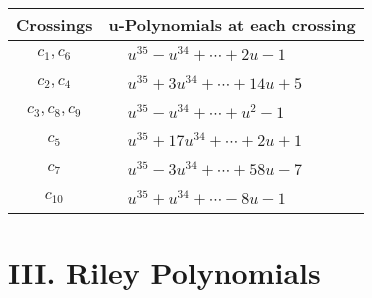 \documentclass[1p]{elsarticle_modified}
\theoremstyle{definition}
\begin{document}
\begin{tabular}{m{50pt}|m{274pt}}
Crossings & \hspace{64pt}u-Polynomials at each crossing \\
\hline $$\begin{aligned}c_{1},c_{6}\end{aligned}$$&$\begin{aligned}
&u^{35}- u^{34}+\cdots+2 u-1
\end{aligned}$\\
\hline $$\begin{aligned}c_{2},c_{4}\end{aligned}$$&$\begin{aligned}
&u^{35}+3 u^{34}+\cdots+14 u+5
\end{aligned}$\\
\hline $$\begin{aligned}c_{3},c_{8},c_{9}\end{aligned}$$&$\begin{aligned}
&u^{35}- u^{34}+\cdots+u^2-1
\end{aligned}$\\
\hline $$\begin{aligned}c_{5}\end{aligned}$$&$\begin{aligned}
&u^{35}+17 u^{34}+\cdots+2 u+1
\end{aligned}$\\
\hline $$\begin{aligned}c_{7}\end{aligned}$$&$\begin{aligned}
&u^{35}-3 u^{34}+\cdots+58 u-7
\end{aligned}$\\
\hline $$\begin{aligned}c_{10}\end{aligned}$$&$\begin{aligned}
&u^{35}+u^{34}+\cdots-8 u-1
\end{aligned}$\\
\hline
\end{tabular}\newpage\renewcommand{\arraystretch}{1}
\centering \section*{ III. Riley Polynomials}
\end{document}
